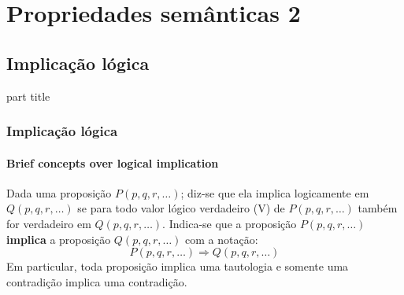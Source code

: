\section{Propriedades semânticas 2}
%
\subsection{Implicação lógica}
%
\begin{frame}[c]
    \begin{beamercolorbox}[rounded=true,shadow=true,sep=12pt,center]{part title}
        \insertsection\par
    \end{beamercolorbox}
\end{frame}
%
\begin{frame}[t]
    \frametitle{Implicação lógica}
    \framesubtitle{Brief concepts over logical implication}
    \begin{tcolorbox}[colback=blue!5,colframe=blue!60!black,adjusted title=Definição]
        \indent Dada uma proposição $P(p,q,r,\dots)$; diz-se que ela implica logicamente em $Q(p,q,r,\dots)$ se para todo valor lógico verdadeiro (V) de $P(p,q,r,\dots)$ também for verdadeiro em $Q(p,q,r,\dots)$.
        \tcblower
        \indent Indica-se que a proposição $P(p,q,r,\dots)$ \textbf{implica} a proposição $Q(p,q,r,\dots)$ com a notação: $$P(p,q,r,\dots) \Rightarrow Q(p,q,r,\dots)$$
        \indent Em particular, toda proposição implica uma tautologia e somente uma contradição implica uma contradição.
    \end{tcolorbox}
\end{frame}
%
